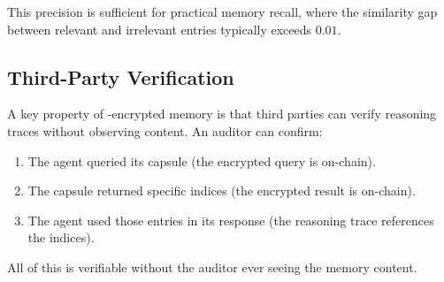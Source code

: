 This precision is sufficient for practical memory recall, where the similarity gap between relevant and irrelevant entries typically exceeds $0.01$.

\subsection{Third-Party Verification}

A key property of \FHE{}-encrypted memory is that third parties can verify reasoning traces without observing content. An auditor can confirm:
\begin{enumerate}
    \item The agent queried its capsule (the encrypted query is on-chain).
    \item The capsule returned specific indices (the encrypted result is on-chain).
    \item The agent used those entries in its response (the reasoning trace references the indices).
\end{enumerate}

All of this is verifiable without the auditor ever seeing the memory content.

